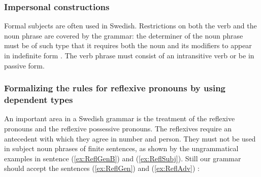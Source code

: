 \documentclass[runningheads,a4paper]{llncs}
\begin{document}
\subsubsection{Impersonal constructions}
\label{sec:Formal}
Formal subjects \cite[]{SAG} are often used in Swedish.
Restrictions on both the verb and the noun phrase are covered by the grammar:
the determiner of the
noun phrase must be of such type that it requires both the noun and its modifiers
to appear in indefinite form \cite{cooper}. The verb phrase must consist of an intransitive verb
or be in passive form.

\subsubsection{Formalizing the rules for reflexive pronouns by using dependent types}
\label{sec:reflexives}
An important area in a Swedish grammar is the treatment of the reflexive pronouns and
the reflexive possessive pronouns.
The reflexives require an antecedent with which they agree in
number and person. They must 
not be used in subject noun phrases of finite sentences,
as shown by the ungrammatical examples in 
sentence (\ref{ex:ReflGenB}) and (\ref{ex:ReflSubj}).
Still our grammar should accept the sentences (\ref{ex:ReflGen})
and (\ref{ex:ReflAdv}) :
\end{document}
